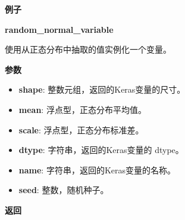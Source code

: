\textbf{例子}

\begin{Shaded}
\begin{Highlighting}[]
\OperatorTok{>>>} \OperatorTok{=} \NormalTok{,}\NormalTok{), }\NormalTok{, }\NormalTok{)}
\OperatorTok{>>>} 
\OperatorTok{<} \OperatorTok{>}
\OperatorTok{>>>} 
\NormalTok{array([[ }\NormalTok{,  }\NormalTok{,  }  \NormalTok{],}
       \NormalTok{[ }\NormalTok{,  }\NormalTok{,  }\NormalTok{]], dtype}\OperatorTok{=}
\end{Highlighting}
\end{Shaded}


\textbf{random\_normal\_variable}\label{randomux5fnormalux5fvariable}

\begin{Shaded}
\begin{Highlighting}[]
\OperatorTok{=}\OperatorTok{=}\OperatorTok{=}\NormalTok{)}
\end{Highlighting}
\end{Shaded}

使用从正态分布中抽取的值实例化一个变量。

\textbf{参数}

\begin{itemize}
\tightlist
\item
  \textbf{shape}: 整数元组，返回的Keras变量的尺寸。
\item
  \textbf{mean}: 浮点型，正态分布平均值。
\item
  \textbf{scale}: 浮点型，正态分布标准差。
\item
  \textbf{dtype}: 字符串，返回的Keras变量的 dtype。
\item
  \textbf{name}: 字符串，返回的Keras变量的名称。
\item
  \textbf{seed}: 整数，随机种子。
\end{itemize}

\textbf{返回}

